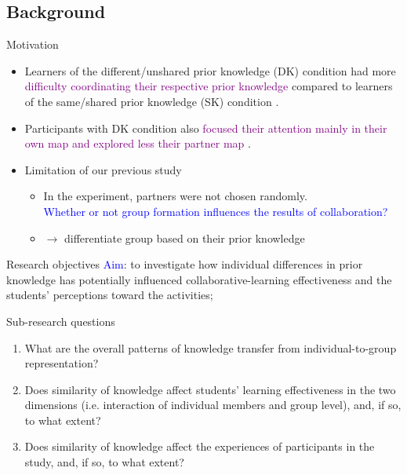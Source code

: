 \subsection{Background}
\begin{frame}{Motivation}
    \begin{itemize}
        \item <1-2> Learners of the different/unshared prior knowledge (DK) condition had more \textcolor{purple}{difficulty coordinating their respective prior knowledge} compared to learners of the same/shared prior knowledge (SK) condition \cite{molinari2017learners}.
        
        \item <1-2> Participants with DK condition also \textcolor{purple}{focused their attention mainly in their own map and explored less their partner map} \cite{molinari2017learners}.

        \item <3->Limitation of our previous study
        \begin{itemize}
            \item <3-> In the experiment, partners were not chosen randomly.\\
            \textcolor{blue}{Whether or not group formation influences the results of collaboration?}
            \item <4>$\longrightarrow$ differentiate group based on their prior knowledge
        \end{itemize}
        
        
    \end{itemize}
\end{frame}
\begin{frame}{Research objectives}
\textcolor{blue}{Aim}:
    to investigate how individual differences in prior knowledge has potentially influenced collaborative-learning effectiveness and the students' perceptions toward the activities;
{
\begin{block}{Sub-research questions}
    \begin{enumerate}
    \item <1> What are the overall patterns of knowledge transfer from individual-to-group representation?
    \item <2> Does similarity of knowledge affect students' learning effectiveness in the two dimensions (i.e. interaction of individual members and group level), and, if so, to what extent?
    \item <3> Does similarity of knowledge affect the experiences of participants in the study, and, if so, to what extent?
\end{enumerate}
\end{block}
}


\end{frame}

